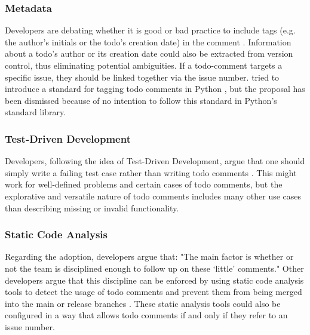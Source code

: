 \subsubsection{Metadata}
Developers are debating whether it is good or bad practice to include tags (e.g. the author's initials or the todo's creation date) in the comment \cite{karacic_todo_2015}.
Information about a todo's author or its creation date could also be extracted from version control, thus eliminating potential ambiguities.
If a todo-comment targets a specific issue, they should be linked together via the issue number.
\citeauthor{elliott_pep_2005} tried to introduce a standard for tagging todo comments in Python \cite{elliott_pep_2005}, but the proposal has been dismissed because of no intention to follow this standard in Python's standard library.

\subsubsection{Test-Driven Development}
Developers, following the idea of Test-Driven Development, argue that one should simply write a failing test case rather than writing todo comments \cite{snoop_does_2016}.
This might work for well-defined problems and certain cases of todo comments, but the explorative and versatile nature of todo comments includes many other use cases than describing missing or invalid functionality.

\subsubsection{Static Code Analysis}
Regarding the adoption, developers argue that: "The main factor is whether or not the team is disciplined enough to follow up on these `little' comments." \cite{karacic_todo_2015}
Other developers argue that this discipline can be enforced by using static code analysis tools to detect the usage of todo comments and prevent them from being merged into the main or release branches \cite{alecxe_how_2018}.
These static analysis tools could also be configured in a way that allows todo comments if and only if they refer to an issue number.

